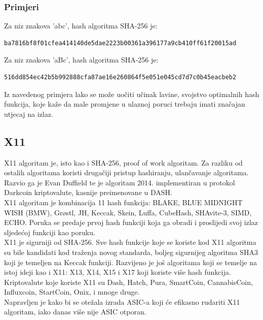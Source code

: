 \documentclass[12pt]{article}
\begin{document}
\pagebreak

\subsubsection{Primjeri}
Za niz znakova 'abc', hash algoritma SHA-256 je:
\begin{verbatim}
ba7816bf8f01cfea414140de5dae2223b00361a396177a9cb410ff61f20015ad
\end{verbatim}
%
Za niz znakova 'aBc', hash algoritma SHA-256 je:
\begin{verbatim}
516dd854ec42b5b992888cfa87ae16e260864f5e051e045cd7d7c0b45eacbeb2
\end{verbatim}
%
Iz navedenog primjera lako se može uočiti učinak lavine, svojstvo optimalnih hash funkcija, koje kaže da male promjene u ulaznoj poruci trebaju imati značajan utjecaj na izlaz.



\subsection{X11}
X11 algoritam je, isto kao i SHA-256, proof of work algoritam. Za razliku od ostalih algoritama koristi drugačiji pristup hashiranju, ulančavanje algoritama. Razvio ga je Evan Duffield te je algoritam 2014. implementiran u protokol Darkcoin kriptovalute, kasnije preimenovane u DASH.\\
X11 algoritam je kombinacija 11 hash funkcija: BLAKE, BLUE MIDNIGHT WISH (BMW), Grøstl, JH, Keccak, Skein, Luffa, CubeHash, SHAvite-3, SIMD, ECHO. Poruka se predaje prvoj hash funkciji koja ga obradi i proslijedi svoj izlaz sljedećoj funkciji kao poruku.\\
X11 je sigurniji od SHA-256. Sve hash funkcije koje se koriste kod X11 algoritma su bile kandidati kod traženja novog standarda, boljeg sigurnijeg algoritma SHA3 koji je temeljen na Keccak funkciji.
Razvijeno je još algoritama koji se temelje na istoj ideji kao i X11: X13, X14, X15 i X17 koji koriste više hash funkcija.\\
Kriptovalute koje koriste X11 su Dash, Hatch, Pura, SmartCoin, CannabisCoin, Influxcoin, StartCoin, Onix, i mnoge druge.\cite{x11-description} \\
Napravljen je kako bi se otežala izrada ASIC-a koji će efikasno rudariti X11 algoritam, iako danas više nije ASIC otporan.\\
\end{document}
